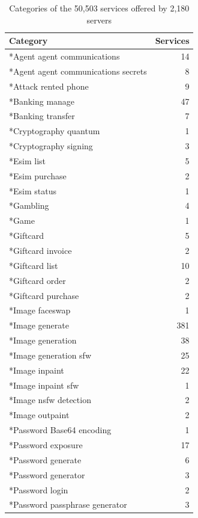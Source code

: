 \begin{table}[htbp]
  \centering
  \caption{Categories of the 50,503 services offered by 2,180 servers}
  \label{tab:service-categories}
  \begin{tabular}{lr}
    \toprule
    Category & Services \\
    \midrule
    *Agent agent communications & 14 \\
    *Agent agent communications secrets & 8 \\
    *Attack rented phone & 9 \\
    *Banking manage & 47 \\
    *Banking transfer & 7 \\
    *Cryptography quantum & 1 \\
    *Cryptography signing & 3 \\
    *Esim list & 5 \\
    *Esim purchase & 2 \\
    *Esim status & 1 \\
    *Gambling & 4 \\
    *Game & 1 \\
    *Giftcard & 5 \\
    *Giftcard invoice & 2 \\
    *Giftcard list & 10 \\
    *Giftcard order & 2 \\
    *Giftcard purchase & 2 \\
    *Image faceswap & 1 \\
    *Image generate & 381 \\
    *Image generation & 38 \\
    *Image generation sfw & 25 \\
    *Image inpaint & 22 \\
    *Image inpaint sfw & 1 \\
    *Image nsfw detection & 2 \\
    *Image outpaint & 2 \\
    *Password Base64 encoding & 1 \\
    *Password exposure & 17 \\
    *Password generate & 6 \\
    *Password generator & 3 \\
    *Password login & 2 \\
    *Password passphrase generator & 3 \\

\end{tabular}
\end{table}

